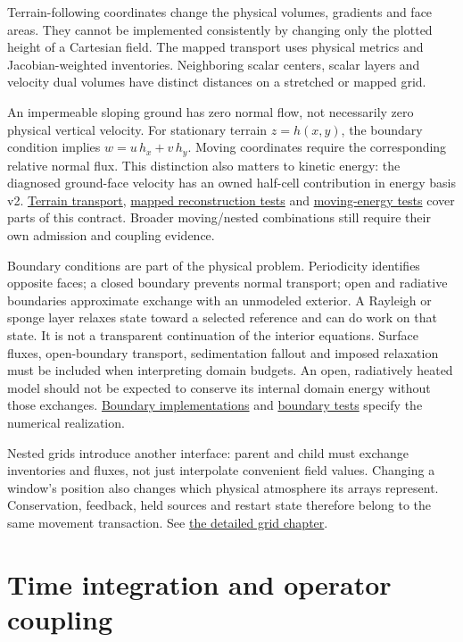 \documentclass[
  11pt,
]{report}
\begin{document}
Terrain-following coordinates change the physical volumes, gradients and
face areas. They cannot be implemented consistently by changing only the
plotted height of a Cartesian field. The mapped transport uses physical
metrics and Jacobian-weighted inventories. Neighboring scalar centers,
scalar layers and velocity dual volumes have distinct distances on a
stretched or mapped grid.

An impermeable sloping ground has zero normal flow, not necessarily zero
physical vertical velocity. For stationary terrain \(z=h(x,y)\), the
boundary condition implies \(w=u\,h_x+v\,h_y\). Moving coordinates
require the corresponding relative normal flux. This distinction also
matters to kinetic energy: the diagnosed ground-face velocity has an
owned half-cell contribution in energy basis v2.
\href{../include/terrain/conservative_transport.hpp}{Terrain transport},
\href{../tests/dynamics/test_mapped_reconstruction.cpp}{mapped
reconstruction tests} and
\href{../tests/dynamics/test_native_moving_energy.cpp}{moving-energy
tests} cover parts of this contract. Broader moving/nested combinations
still require their own admission and coupling evidence.

Boundary conditions are part of the physical problem. Periodicity
identifies opposite faces; a closed boundary prevents normal transport;
open and radiative boundaries approximate exchange with an unmodeled
exterior. A Rayleigh or sponge layer relaxes state toward a selected
reference and can do work on that state. It is not a transparent
continuation of the interior equations. Surface fluxes, open-boundary
transport, sedimentation fallout and imposed relaxation must be included
when interpreting domain budgets. An open, radiatively heated model
should not be expected to conserve its internal domain energy without
those exchanges. \href{../src/boundary_conditions/}{Boundary
implementations} and
\href{../tests/dynamics/test_cartesian_boundary_conditions.cpp}{boundary
tests} specify the numerical realization.

Nested grids introduce another interface: parent and child must exchange
inventories and fluxes, not just interpolate convenient field values.
Changing a window's position also changes which physical atmosphere its
arrays represent. Conservation, feedback, held sources and restart state
therefore belong to the same movement transaction. See
\hyperref[grid-deep-dive]{the detailed grid chapter}.

\section{Time integration and operator
coupling}\label{time-integration-and-operator-coupling}
\end{document}
